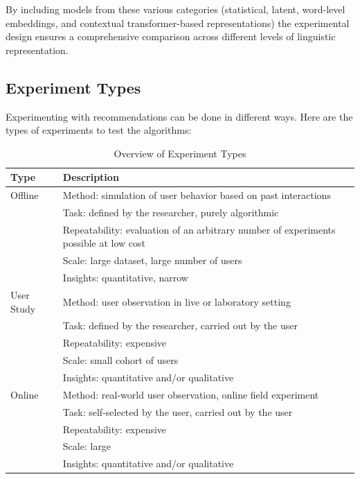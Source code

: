 \documentclass[\myFontSize,a4paper,oneside,english,hidelinks]{article}
\begin{document}
\begin{enumerate}
\end{enumerate}
%
By including models from these various categories (statistical, latent, word-level embeddings, and contextual transformer-based representations) the experimental design ensures a comprehensive comparison across different levels of linguistic representation.
%
\subsection{Experiment Types}
%
Experimenting with recommendations can be done in different ways. Here are the types of experiments to test the algorithms:
{
\renewcommand{\arraystretch}{1.5}
\begin{table}[h!]
\centering
\begin{tabular}{p{3cm}|p{10cm}}
\hline
\textbf{Type} & \textbf{Description} \\
\hline
Offline & Method: simulation of user behavior based on past interactions \\
        & Task: defined by the researcher, purely algorithmic \\
        & Repeatability: evaluation of an arbitrary number of experiments possible at low cost \\
        & Scale: large dataset, large number of users \\
        & Insights: quantitative, narrow \\
\hline
User Study & Method: user observation in live or laboratory setting \\
           & Task: defined by the researcher, carried out by the user \\
           & Repeatability: expensive \\
           & Scale: small cohort of users \\
           & Insights: quantitative and/or qualitative \\
\hline
Online & Method: real-world user observation, online field experiment \\
       & Task: self-selected by the user, carried out by the user \\
       & Repeatability: expensive \\
       & Scale: large \\
       & Insights: quantitative and/or qualitative \\
\hline
\end{tabular}

\caption{Overview of Experiment Types \cite{Zangerle2023}}
\end{table}\\
}
\end{document}
